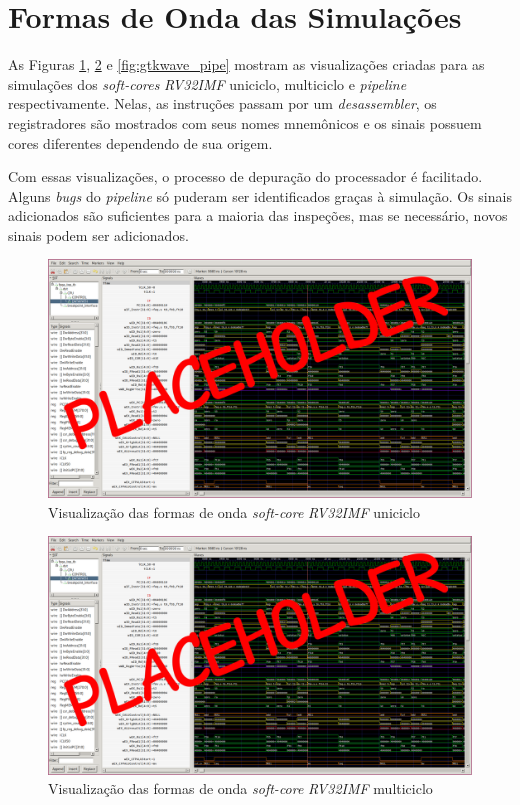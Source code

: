 \section{Formas de Onda das Simulações}
    { As Figuras \ref{fig:gtkwave_uni}, \ref{fig:gtkwave_multi} e \ref{fig:gtkwave_pipe}
        mostram as visualizações criadas para as simulações dos \textit{soft-cores}
        \textit{RV32IMF} uniciclo, multiciclo e \textit{pipeline} respectivamente.
        Nelas, as instruções passam por um \textit{desassembler}, os registradores
        são mostrados com seus nomes mnemônicos e os sinais possuem cores diferentes
        dependendo de sua origem.
    }

    { Com essas visualizações, o processo de depuração do processador é facilitado.
        Alguns \textit{bugs} do \textit{pipeline} só puderam ser identificados graças
        à simulação. Os sinais adicionados são suficientes para a maioria das inspeções,
        mas se necessário, novos sinais podem ser adicionados.
    }

    \begin{figure}[H]
    \centering
        \includegraphics[width=0.9\linewidth]{../images/gtkwave/gtkwave_uni.png}
        \caption{Visualização das formas de onda \textit{soft-core} \textit{RV32IMF} uniciclo}
        \label{fig:gtkwave_uni}
    \end{figure}

    \begin{figure}[H]
    \centering
        \includegraphics[width=0.9\linewidth]{../images/gtkwave/gtkwave_multi.png}
        \caption{Visualização das formas de onda \textit{soft-core} \textit{RV32IMF} multiciclo}
        \label{fig:gtkwave_multi}
    \end{figure}

